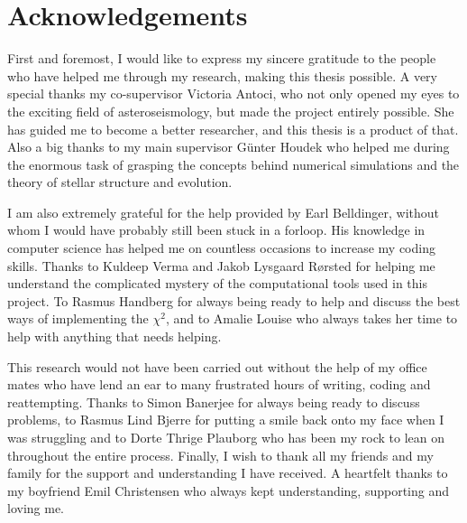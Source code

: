\documentclass[a4paper,twoside,11pt]{memoir}
\newcommand{\chis}{\ensuremath{\chi^2}\xspace}
\begin{document}
\chapter*{Acknowledgements}

First and foremost, I would like to express my sincere gratitude to the people who have helped me through my research, making this thesis possible. 
A very special thanks my co-supervisor Victoria Antoci, who not only opened my eyes to the exciting field of asteroseismology, but made the project entirely possible. She has guided me to become a better researcher, and this thesis is a product of that. 
Also a big thanks to my main supervisor Günter Houdek who helped me during the enormous task of grasping the concepts behind numerical simulations and the theory of stellar structure and evolution.  

I am also extremely grateful for the help provided by Earl Belldinger, without whom I would have probably still been stuck in a forloop. His knowledge in computer science has helped me on countless occasions to  increase my coding skills.  Thanks to Kuldeep Verma and Jakob Lysgaard Rørsted for helping me understand the complicated mystery of the computational tools used in this project. To Rasmus Handberg for always being ready to help and discuss the best ways of implementing the \chis, and to Amalie Louise who always takes her time to help with anything that needs helping.  

This research would not have been carried out without the help of my office mates who have lend an ear to many frustrated hours of writing, coding and reattempting. Thanks to Simon Banerjee for always being ready to discuss problems, to Rasmus Lind Bjerre for putting a smile back onto my face when I was struggling and to Dorte Thrige Plauborg who has been my rock to lean on throughout the entire process. 
Finally, I wish to thank all my friends and my family for the support and understanding I have received. A heartfelt thanks to my boyfriend Emil Christensen who always kept understanding, supporting and loving me. 

\newpage
\tableofcontents












\end{document}
